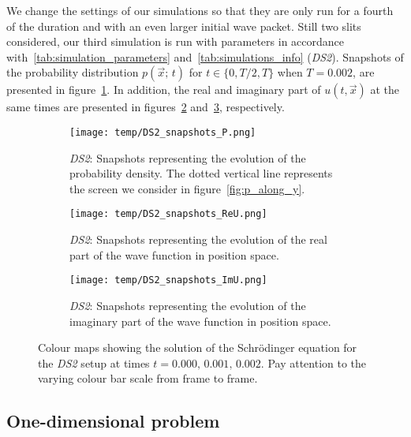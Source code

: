     We change the settings of our simulations so that they are only run for a fourth of the duration and with an even larger initial wave packet. Still two slits considered, our third simulation is run with parameters in accordance with~\ref{tab:simulation_parameters} and~\ref{tab:simulations_info} (\textit{DS2}). Snapshots of the probability distribution $p(\vec{x};\, t)$ for $t\in\{0,T/2,T\}$ when $T=0.002$, are presented in figure~\ref{fig:snapshots_p_DS2}. In addition, the real and imaginary part of $u(t, \vec{x})$ at the same times are presented in figures~\ref{fig:snapshots_ReU_DS2} and~\ref{fig:snapshots_ImU_DS2}, respectively.

    \begin{figure*}
        \centering
        \begin{subfigure}{0.92\textwidth}
            \texttt{[image: temp/DS2\_snapshots\_P.png]}
            \caption{\textit{DS2}: Snapshots representing the evolution of the probability density. The dotted vertical line represents the screen we consider in figure~\ref{fig:p_along_y}.}
            \label{fig:snapshots_p_DS2}
        \end{subfigure}
        \hfill
        \begin{subfigure}{0.92\textwidth}
            \texttt{[image: temp/DS2\_snapshots\_ReU.png]}
            \caption{\textit{DS2}: Snapshots representing the evolution of the real part of the wave function in position space.}
            \label{fig:snapshots_ReU_DS2}
        \end{subfigure}
        \hfill
        \begin{subfigure}{0.92\textwidth}
            \texttt{[image: temp/DS2\_snapshots\_ImU.png]}
            \caption{\textit{DS2}: Snapshots representing the evolution of the imaginary part of the wave function in position space.}
            \label{fig:snapshots_ImU_DS2}
        \end{subfigure}
        \caption{Colour maps showing the solution of the Schrödinger equation for the \textit{DS2} setup at times $t=0.000,\, 0.001, \,0.002$. Pay attention to the varying colour bar scale from frame to frame.}
        \label{fig:snapshots_DS2}
    \end{figure*}


\subsection{One-dimensional problem}

